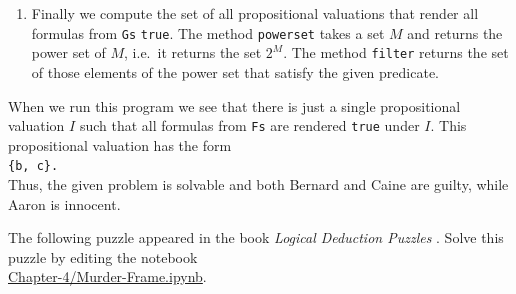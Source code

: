 \begin{enumerate}
\begin{enumerate}[(a)]
            Hence \texttt{I} is a subset of \texttt{P}
      \end{enumerate}
      If all propositional formulas $f$ from the list \texttt{Gs} evaluate as \texttt{true} given the valuation
      \texttt{I}, then \texttt{allTrue} returns the result \texttt{true}, otherwise \texttt{false} is returned.
      The method \texttt{allMatch} checks whether all elements of a stream satisfy the given predicate.
\item Finally we compute the set of all propositional valuations that render all formulas from \texttt{Gs} \texttt{true}.
      The method \texttt{powerset} takes a set $M$ and returns the power set of $M$, i.e.~it returns the set
      $2^M$.  The method \texttt{filter} returns the set of those elements of the power set that satisfy the
      given predicate.
\end{enumerate}
When we run this program we see that there is just a single propositional valuation $I$ such that all formulas
from \texttt{Fs} are rendered \texttt{true} under $I$.  This propositional valuation has the form
\\[0.2cm]
\hspace*{1.3cm}
\texttt{\{b, c\}.}
\\[0.2cm]
Thus, the given problem is solvable and both Bernard and Caine are guilty, while Aaron is innocent.

\exerciseEng
The following puzzle appeared in the book \emph{Logical Deduction Puzzles} \cite{summers:2006}.
Solve this puzzle by editing the notebook
\\[0.2cm]
\hspace*{1.3cm}
\href{https://github.com/karlstroetmann/Logic/blob/master/Java/Chapter-4/Murder-Frame.ipynb}{Chapter-4/Murder-Frame.ipynb}.

